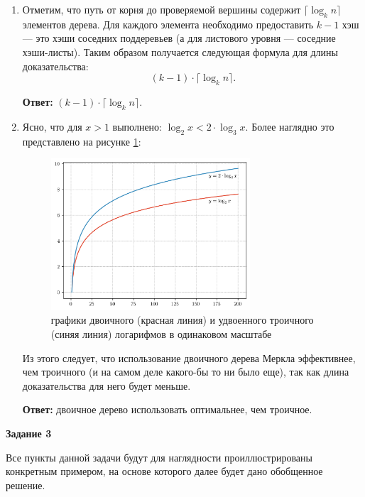 \documentclass[12pt, a4paper]{extarticle}
\newenvironment*{dummyenv}{}{}
\newcommand{\mysection}[1]{
    \addcontentsline{toc}{section}{#1}
    \begin{dummyenv}
        \bfseries\large #1
    \end{dummyenv}
}
\newcommand{\Answer}[1]{\textbf{Ответ:} #1}
\begin{document}
\begin{enumerate}
    \item Отметим, что путь от корня до проверяемой вершины содержит $\lceil \log_k n \rceil$
        элементов дерева. Для каждого элемента необходимо предоставить $k - 1$ хэш --- это
        хэши соседних поддеревьев (а для листового уровня --- соседние хэши-листы). Таким
        образом получается следующая формула для длины доказательства: 
        \begin{equation}
            (k - 1) \cdot \lceil \log_k n \rceil.
        \end{equation}
        
        \Answer{$(k - 1) \cdot \lceil \log_k n \rceil$}.
        
    \item Ясно, что для $x > 1$ выполнено: $\log_2 x < 2 \cdot \log_3 x$. Более наглядно это
        представлено на рисунке \ref{fig:2.3}:
        \begin{figure}[h!]
            \centering
            \includegraphics[width=0.7\textwidth]{2.3.png}
            \caption{графики двоичного (красная линия) и удвоенного троичного (синяя линия) 
                логарифмов в одинаковом масштабе}
            \label{fig:2.3}
        \end{figure}
        
        Из этого следует, что использование двоичного дерева Меркла эффективнее, чем троичного (и на 
        самом деле какого-бы то ни было еще), так как длина доказательства для него будет меньше.
        
        \Answer{двоичное дерево использовать оптимальнее, чем троичное}.
\end{enumerate}

\mysection{Задание 3}

Все пункты данной задачи будут для наглядности проиллюстрированы конкретным примером, на основе
которого далее будет дано обобщенное решение.
\end{document}
